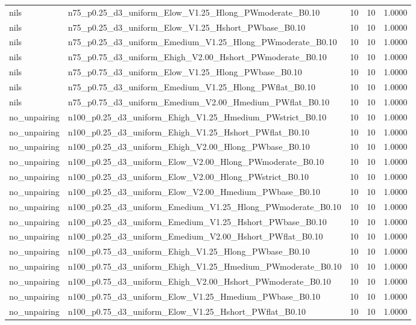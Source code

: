 \begin{tabular}{llrrr}
nils & n75_p0.25_d3_uniform_Elow_V1.25_Hlong_PWmoderate_B0.10 & 10 & 10 & 1.0000 \\
nils & n75_p0.25_d3_uniform_Elow_V1.25_Hshort_PWbase_B0.10 & 10 & 10 & 1.0000 \\
nils & n75_p0.25_d3_uniform_Emedium_V1.25_Hlong_PWmoderate_B0.10 & 10 & 10 & 1.0000 \\
nils & n75_p0.75_d3_uniform_Ehigh_V2.00_Hshort_PWmoderate_B0.10 & 10 & 10 & 1.0000 \\
nils & n75_p0.75_d3_uniform_Elow_V1.25_Hlong_PWbase_B0.10 & 10 & 10 & 1.0000 \\
nils & n75_p0.75_d3_uniform_Emedium_V1.25_Hlong_PWflat_B0.10 & 10 & 10 & 1.0000 \\
nils & n75_p0.75_d3_uniform_Emedium_V2.00_Hmedium_PWflat_B0.10 & 10 & 10 & 1.0000 \\
no_unpairing & n100_p0.25_d3_uniform_Ehigh_V1.25_Hmedium_PWstrict_B0.10 & 10 & 10 & 1.0000 \\
no_unpairing & n100_p0.25_d3_uniform_Ehigh_V1.25_Hshort_PWflat_B0.10 & 10 & 10 & 1.0000 \\
no_unpairing & n100_p0.25_d3_uniform_Ehigh_V2.00_Hlong_PWbase_B0.10 & 10 & 10 & 1.0000 \\
no_unpairing & n100_p0.25_d3_uniform_Elow_V2.00_Hlong_PWmoderate_B0.10 & 10 & 10 & 1.0000 \\
no_unpairing & n100_p0.25_d3_uniform_Elow_V2.00_Hlong_PWstrict_B0.10 & 10 & 10 & 1.0000 \\
no_unpairing & n100_p0.25_d3_uniform_Elow_V2.00_Hmedium_PWbase_B0.10 & 10 & 10 & 1.0000 \\
no_unpairing & n100_p0.25_d3_uniform_Emedium_V1.25_Hlong_PWmoderate_B0.10 & 10 & 10 & 1.0000 \\
no_unpairing & n100_p0.25_d3_uniform_Emedium_V1.25_Hshort_PWbase_B0.10 & 10 & 10 & 1.0000 \\
no_unpairing & n100_p0.25_d3_uniform_Emedium_V2.00_Hshort_PWflat_B0.10 & 10 & 10 & 1.0000 \\
no_unpairing & n100_p0.75_d3_uniform_Ehigh_V1.25_Hlong_PWbase_B0.10 & 10 & 10 & 1.0000 \\
no_unpairing & n100_p0.75_d3_uniform_Ehigh_V1.25_Hmedium_PWmoderate_B0.10 & 10 & 10 & 1.0000 \\
no_unpairing & n100_p0.75_d3_uniform_Ehigh_V2.00_Hshort_PWmoderate_B0.10 & 10 & 10 & 1.0000 \\
no_unpairing & n100_p0.75_d3_uniform_Elow_V1.25_Hmedium_PWbase_B0.10 & 10 & 10 & 1.0000 \\
no_unpairing & n100_p0.75_d3_uniform_Elow_V1.25_Hshort_PWflat_B0.10 & 10 & 10 & 1.0000 \\

\end{tabular}
